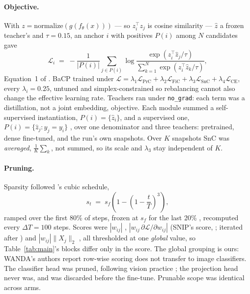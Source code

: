 \paragraph{Objective.}
With $z = \mathrm{normalize}(g(f_\theta(x)))$ --- so $z_i^{\top} z_j$ is cosine
similarity --- $\hat z$ a frozen teacher's and $\tau = 0.15$, an anchor $i$ with
positives $P(i)$ among $N$ candidates gave
%
\begin{equation}
\label{eq:functional}
\mathcal{L}_i \;=\; -\frac{1}{|P(i)|}\sum_{j \in P(i)}
\log \frac{\exp\!\left(z_i^{\top}\hat z_j / \tau\right)}
          {\sum_{k=1}^{N}\exp\!\left(z_i^{\top}\hat z_k / \tau\right)} ,
\end{equation}
%
Equation~1 of \citet{xu2022cap}. BaCP trained under
$\mathcal{L} = \lambda_1 \mathcal{L}_{\mathrm{PrC}} + \lambda_2
\mathcal{L}_{\mathrm{FiC}} + \lambda_3 \mathcal{L}_{\mathrm{SnC}} + \lambda_4
\mathcal{L}_{\mathrm{CE}}$, every $\lambda_i = 0.25$, untuned and
simplex-constrained so rebalancing cannot also change the effective learning
rate. Teachers ran under \texttt{no\_grad}: each term was a distillation, not a
joint embedding, objective. Each module summed a self-supervised instantiation,
$P(i) = \{\hat z_i\}$, and a supervised one, $P(i) = \{\hat z_j : y_j = y_i\}$
\citep{khosla2020supcon}, over one denominator and three teachers: pretrained,
dense fine-tuned, and the run's own snapshots. Over $K$ snapshots
SnC was \emph{averaged}, $\frac{1}{K}\sum_k$, not summed, so its scale and
$\lambda_3$ stay independent of $K$.

\paragraph{Pruning.}
Sparsity followed \citet{zhu2018prune}'s cubic schedule,
%
\begin{equation}
\label{eq:cubic}
s_t \;=\; s_f\left(1 - \left(1 - \frac{t}{T}\right)^{\!3}\right),
\end{equation}
%
ramped over the first 80\% of steps, frozen at $s_f$ for the last 20\%
\citep{gale2019state}, recomputed every $\Delta T = 100$ steps. Scores were
$|w_{ij}|$ \citep{han2015learning},
$|w_{ij}\,\partial\mathcal{L}/\partial w_{ij}|$ (SNIP's score,
\citealp{lee2019snip}; iterated after \citealp{verdenius2020snipit}) and
$|w_{ij}|\lVert X_j\rVert_2$
\citep{sun2024wanda}, all thresholded at one \emph{global} value, so
Table~\ref{tab:main}'s blocks differ only in the score. The global grouping
is ours: WANDA's authors report row-wise scoring does not transfer to image
classifiers. The classifier head was pruned, following vision practice
\citep{evci2020rigl,liu2021granet}; the projection head never was, and was
discarded before the fine-tune. Prunable scope was identical across arms.

